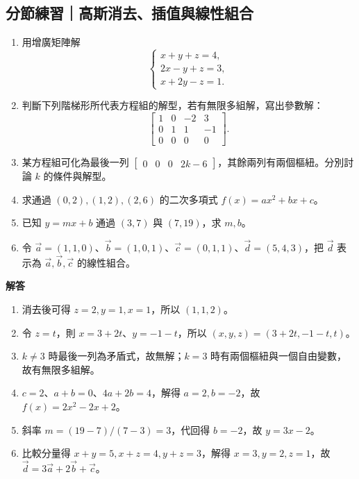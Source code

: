 \documentclass[11pt,a4paper]{article}
\providecommand{\tightlist}{%
  \setlength{\itemsep}{0pt}\setlength{\parskip}{0pt}}
\begin{document}
\begin{HandoutSelfCheck}

\subsection{分節練習｜高斯消去、插值與線性組合}\label{ux5206ux7bc0ux7df4ux7fd2ux9ad8ux65afux6d88ux53bbux63d2ux503cux8207ux7ddaux6027ux7d44ux5408}

\begin{enumerate}
\def\labelenumi{\arabic{enumi}.}
\tightlist
\item
  用增廣矩陣解
  \[
  \begin{cases}
  x+y+z=4,\\
  2x-y+z=3,\\
  x+2y-z=1.
  \end{cases}
  \]
\item
  判斷下列階梯形所代表方程組的解型，若有無限多組解，寫出參數解：
  \[
  \left[
  \begin{array}{ccc|c}
  1&0&-2&3\\
  0&1&1&-1\\
  0&0&0&0
  \end{array}
  \right].
  \]
\item
  某方程組可化為最後一列 \(\left[\begin{array}{ccc|c}0&0&0&2k-6\end{array}\right]\)，其餘兩列有兩個樞紐。分別討論 \(k\) 的條件與解型。
\item
  求通過 \((0,2),(1,2),(2,6)\) 的二次多項式 \(f(x)=ax^2+bx+c\)。
\item
  已知 \(y=mx+b\) 通過 \((3,7)\) 與 \((7,19)\)，求 \(m,b\)。
\item
  令 \(\vec a=(1,1,0)\)、\(\vec b=(1,0,1)\)、\(\vec c=(0,1,1)\)、\(\vec d=(5,4,3)\)，把 \(\vec d\) 表示為 \(\vec a,\vec b,\vec c\) 的線性組合。
\end{enumerate}

\textbf{解答}

\begin{enumerate}
\def\labelenumi{\arabic{enumi}.}
\tightlist
\item
  消去後可得 \(z=2,y=1,x=1\)，所以 \(\boxed{(1,1,2)}\)。
\item
  令 \(z=t\)，則 \(x=3+2t\)、\(y=-1-t\)，所以 \(\boxed{(x,y,z)=(3+2t,-1-t,t)}\)。
\item
  \(k\ne3\) 時最後一列為矛盾式，故無解；\(k=3\) 時有兩個樞紐與一個自由變數，故有無限多組解。
\item
  \(c=2\)、\(a+b=0\)、\(4a+2b=4\)，解得 \(a=2,b=-2\)，故 \(\boxed{f(x)=2x^2-2x+2}\)。
\item
  斜率 \(m=(19-7)/(7-3)=3\)，代回得 \(b=-2\)，故 \(\boxed{y=3x-2}\)。
\item
  比較分量得 \(x+y=5,x+z=4,y+z=3\)，解得 \(x=3,y=2,z=1\)，故 \(\boxed{\vec d=3\vec a+2\vec b+\vec c}\)。
\end{enumerate}

\end{HandoutSelfCheck}
\end{document}
